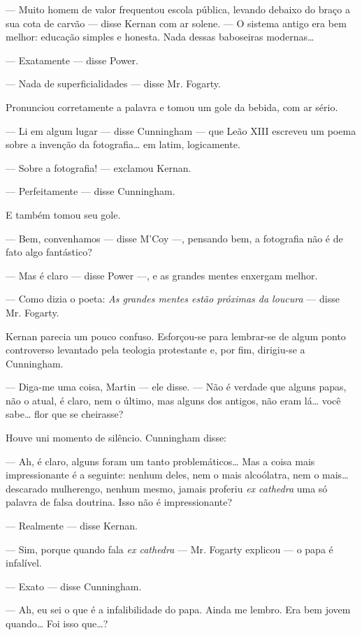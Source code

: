 --- Muito homem de valor frequentou escola pública, levando debaixo do
braço a sua cota de carvão --- disse Kernan com ar solene. --- O
sistema antigo era bem melhor: educação simples e honesta. Nada
dessas baboseiras modernas\ldots{}

--- Exatamente --- disse Power.

--- Nada de superficialidades --- disse Mr. Fogarty.

Pronunciou corretamente a palavra e tomou um gole da bebida, com ar
sério.

--- Li em algum lugar --- disse Cunningham --- que Leão XIII escreveu
um poema sobre a invenção da fotografia\ldots{} em latim, logicamente.

--- Sobre a fotografia! --- exclamou Kernan.

--- Perfeitamente --- disse Cunningham.

E também tomou seu gole.

--- Bem, convenhamos --- disse M'Coy ---, pensando bem, a fotografia
não é de fato algo fantástico?

--- Mas é claro --- disse Power ---, e as grandes mentes enxergam
melhor.

--- Como dizia o poeta: \textit{As grandes mentes estão próximas da loucura}
--- disse Mr. Fogarty.

Kernan parecia um pouco confuso. Esforçou-se para lembrar-se de algum
ponto controverso levantado pela teologia protestante e, por fim,
dirigiu-se a Cunningham.

--- Diga-me uma coisa, Martin --- ele disse. --- Não é verdade que
alguns papas, não o atual, é claro, nem o último, mas alguns dos
antigos, não eram lá\ldots{} você sabe\ldots{} flor que se cheirasse?

Houve uni momento de silêncio. Cunningham disse:

--- Ah, é claro, alguns foram um tanto problemáticos\ldots{} Mas a coisa
mais impressionante é a seguinte: nenhum deles, nem o mais
alcoólatra, nem o mais\ldots{} descarado mulherengo, nenhum mesmo, jamais
proferiu \textit{ex cathedra} uma só palavra de falsa doutrina. Isso não é
impressionante?

--- Realmente --- disse Kernan.

--- Sim, porque quando fala \textit{ex cathedra} --- Mr. Fogarty explicou 
--- o papa é infalível.

--- Exato --- disse Cunningham.

--- Ah, eu sei o que é a infalibilidade do papa. Ainda me lembro. Era
bem jovem quando\ldots{} Foi isso que\ldots{}?

